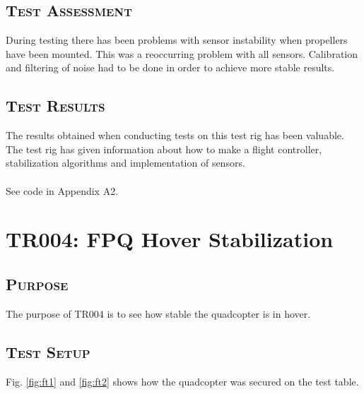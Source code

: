 \subsection*{\textsc{\medium Test Assessment}}
During testing there has been problems with sensor instability when propellers have been mounted. This was a reoccurring problem with all sensors. Calibration and filtering of noise had to be done in order to achieve more stable results.

\subsection*{\textsc{\medium Test Results}}
The results obtained when conducting tests on this test rig has been valuable. The test rig has given information about how to make a flight controller, stabilization algorithms and implementation of sensors.\\
\\
See code in Appendix A2.
\newpage


\section{TR004: FPQ Hover Stabilization}
         {}
\subsection*{\textsc{\medium Purpose}}
The purpose of TR004 is to see how stable the quadcopter is in hover.

\subsection*{\textsc{\medium Test Setup}}
Fig. \ref{fig:ft1} and \ref{fig:ft2} shows how the quadcopter was secured on the test table.

